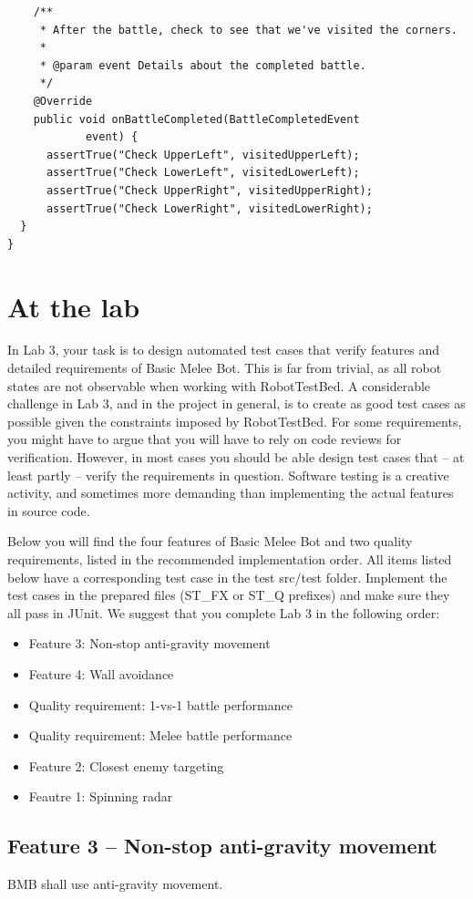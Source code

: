 \documentclass{scrreprt}
\begin{document}
\begin{verbatim}
	/**
	 * After the battle, check to see that we've visited the corners.
	 *
	 * @param event Details about the completed battle.
	 */
	@Override
	public void onBattleCompleted(BattleCompletedEvent
			event) {
      assertTrue("Check UpperLeft", visitedUpperLeft);
      assertTrue("Check LowerLeft", visitedLowerLeft);
      assertTrue("Check UpperRight", visitedUpperRight);
      assertTrue("Check LowerRight", visitedLowerRight);
  }
}
\end{verbatim}

\chapter{At the lab} \label{sec:atlab}
In Lab 3, your task is to design automated test cases that verify features and detailed requirements of Basic Melee Bot. This is far from trivial, as all robot states are not observable when working with RobotTestBed. A considerable challenge in Lab 3, and in the project in general, is to create as good test cases as possible given the constraints imposed by RobotTestBed. For some requirements, you might have  to argue that you will have to rely on code reviews for verification. However, in most cases you should be able design test cases that -- at least partly -- verify the requirements in question. Software testing is a creative activity, and sometimes more demanding than implementing the actual features in source code.

Below you will find the four features of Basic Melee Bot and two quality requirements, listed in the recommended implementation order. All items listed below have a corresponding test case in the test src/test folder. Implement the test cases in the prepared files (ST_FX or ST_Q prefixes) and make sure they all pass in JUnit. We suggest that you complete Lab 3 in the following order:

\begin{itemize}
\item Feature 3: Non-stop anti-gravity movement
\item Feature 4: Wall avoidance 
\item Quality requirement: 1-vs-1 battle performance
\item Quality requirement: Melee battle performance
\item Feature 2: Closest enemy targeting
\item Feautre 1: Spinning radar
\end{itemize}

\section{Feature 3 -- Non-stop anti-gravity movement}
BMB shall use anti-gravity movement.
	
\end{document}
